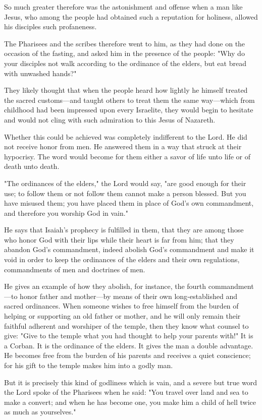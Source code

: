 So much greater therefore was the astonishment and offense when a man like Jesus, who among the people had obtained such a reputation for holiness, allowed his disciples such profaneness.

The Pharisees and the scribes therefore went to him, as they had done on the occasion of the fasting, and asked him in the presence of the people: "Why do your disciples not walk according to the ordinance of the elders, but eat bread with unwashed hands?"

They likely thought that when the people heard how lightly he himself treated the sacred customs—and taught others to treat them the same way—which from childhood had been impressed upon every Israelite, they would begin to hesitate and would not cling with such admiration to this Jesus of Nazareth.

Whether this could be achieved was completely indifferent to the Lord. He did not receive honor from men. He answered them in a way that struck at their hypocrisy. The word would become for them either a savor of life unto life or of death unto death.

"The ordinances of the elders," the Lord would say, "are good enough for their use; to follow them or not follow them cannot make a person blessed. But you have misused them; you have placed them in place of God's own commandment, and therefore you worship God in vain."

He says that Isaiah's prophecy is fulfilled in them, that they are among those who honor God with their lips while their heart is far from him; that they abandon God's commandment, indeed abolish God's commandment and make it void in order to keep the ordinances of the elders and their own regulations, commandments of men and doctrines of men.

He gives an example of how they abolish, for instance, the fourth commandment—to honor father and mother—by means of their own long‑established and sacred ordinances. When someone wishes to free himself from the burden of helping or supporting an old father or mother, and he will only remain their faithful adherent and worshiper of the temple, then they know what counsel to give: "Give to the temple what you had thought to help your parents with!" It is a Corban. It is the ordinance of the elders. It gives the man a double advantage. He becomes free from the burden of his parents and receives a quiet conscience; for his gift to the temple makes him into a godly man.

But it is precisely this kind of godliness which is vain, and a severe but true word the Lord spoke of the Pharisees when he said: "You travel over land and sea to make a convert; and when he has become one, you make him a child of hell twice as much as yourselves."


